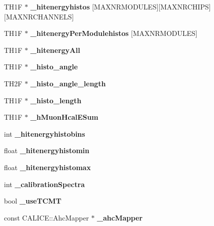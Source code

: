 \begin{DoxyCompactItemize}
\item 
TH1F $\ast$ {\bfseries \_\-hitenergyhistos} [MAXNRMODULES][MAXNRCHIPS][MAXNRCHANNELS]\label{classCellAnalysisProcessor_abe9cc1725be61c389b70abd43791a8ef}

\item 
TH1F $\ast$ {\bfseries \_\-hitenergyPerModulehistos} [MAXNRMODULES]\label{classCellAnalysisProcessor_ac421ca529c9c5f59d9f30ae91976a19d}

\item 
TH1F $\ast$ {\bfseries \_\-hitenergyAll}\label{classCellAnalysisProcessor_a9dbc72d25ba3ea61afad091824bb0d23}

\item 
TH1F $\ast$ {\bfseries \_\-histo\_\-angle}\label{classCellAnalysisProcessor_a54963d51732ca11c544d28d2b46a4481}

\item 
TH2F $\ast$ {\bfseries \_\-histo\_\-angle\_\-length}\label{classCellAnalysisProcessor_aae093b58b62c4bedd21d65a3d167e15e}

\item 
TH1F $\ast$ {\bfseries \_\-histo\_\-length}\label{classCellAnalysisProcessor_a98dddeb420929ad38af64a28a60464a8}

\item 
TH1F $\ast$ {\bfseries \_\-hMuonHcalESum}\label{classCellAnalysisProcessor_a79e268c370d2149184071b1b57b5591f}

\item 
int {\bfseries \_\-hitenergyhistobins}\label{classCellAnalysisProcessor_a568909800005abf7c332e9e015de3da5}

\item 
float {\bfseries \_\-hitenergyhistomin}\label{classCellAnalysisProcessor_a948d7a77688d1ea74f84bad154af22fa}

\item 
float {\bfseries \_\-hitenergyhistomax}\label{classCellAnalysisProcessor_a73d5f3effdc45d019b71c73feb9ef7ad}

\item 
int {\bfseries \_\-calibrationSpectra}\label{classCellAnalysisProcessor_a75de8ff1fc14d9ae09721819c3aff65d}

\item 
bool {\bfseries \_\-useTCMT}\label{classCellAnalysisProcessor_af0fcd0ebc329224397f66672642d7ee6}

\item 
const CALICE::AhcMapper $\ast$ {\bfseries \_\-ahcMapper}\label{classCellAnalysisProcessor_a0cabfd5fcde81a59e8b22f55fb468f2d}

\end{DoxyCompactItemize}
